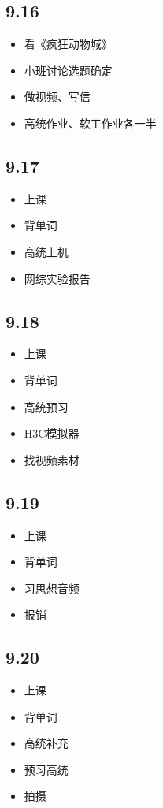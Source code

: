 \documentclass[UTF8]{ctexart}
\begin{document}
\subsection*{9.16}
\begin{itemize}
    \item 看《疯狂动物城》
    \item 小班讨论选题确定
    \item 做视频、写信
    \item 高统作业、软工作业各一半
\end{itemize}
\subsection*{9.17}
\begin{itemize}
    \item 上课
    \item 背单词
    \item 高统上机
    \item 网综实验报告
\end{itemize}
\subsection*{9.18}
\begin{itemize}
    \item 上课
    \item 背单词
    \item 高统预习
    \item H3C模拟器
    \item 找视频素材
\end{itemize}
\subsection*{9.19}
\begin{itemize}
    \item 上课
    \item 背单词
    \item 习思想音频
    \item 报销
\end{itemize}
\subsection*{9.20}
\begin{itemize}
    \item 上课
    \item 背单词
    \item 高统补充
    \item 预习高统
    \item 拍摄
\end{itemize}
\end{document}
